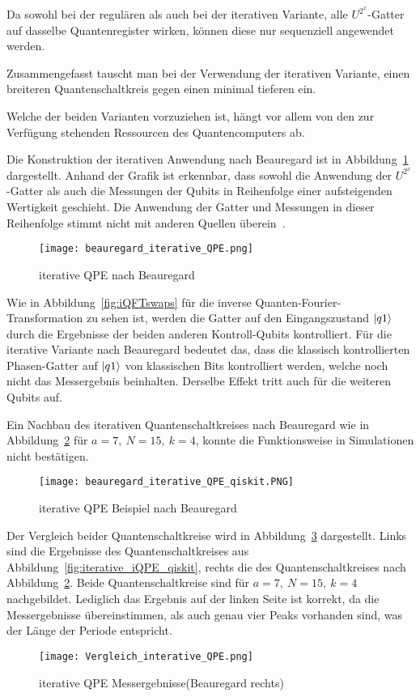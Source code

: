 Da sowohl bei der regulären als auch bei der iterativen Variante, 
alle \(U^{2^x}\)-Gatter auf dasselbe Quantenregister wirken, 
können diese nur sequenziell angewendet werden.

Zusammengefasst tauscht man bei der Verwendung der iterativen Variante, 
einen breiteren Quantenschaltkreis gegen einen minimal tieferen ein.

Welche der beiden Varianten vorzuziehen ist, 
hängt vor allem von den zur Verfügung stehenden Ressourcen des Quantencomputers ab.

\vspace{1em}

Die Konstruktion der iterativen Anwendung nach Beauregard ist in Abbildung~\ref{fig:iterative_iQPE_Beauregard} dargestellt.
Anhand der Grafik ist erkennbar, 
dass sowohl die Anwendung der \(U^{2^x}\)-Gatter als auch die Messungen der Qubits in Reihenfolge einer aufsteigenden Wertigkeit geschieht.
Die Anwendung der Gatter und Messungen in dieser Reihenfolge stimmt nicht mit anderen Quellen überein~\cite{Parker2000}.

\begin{figure}[H]
  \centering
  \texttt{[image: beauregard\_iterative\_QPE.png]}
  \caption{iterative QPE nach Beauregard~\cite{beauregard2003circuit}}
  \label{fig:iterative_iQPE_Beauregard}
\end{figure}

Wie in Abbildung~\ref{fig:iQFTswaps} für die inverse Quanten-Fourier-Transformation zu sehen ist, 
werden die Gatter auf den Eingangszustand \(\ket{q1}\) durch die Ergebnisse der beiden anderen Kontroll-Qubits kontrolliert.
Für die iterative Variante nach Beauregard bedeutet das, 
dass die klassisch kontrollierten Phasen-Gatter auf \(\ket{q1}\) von klassischen Bits kontrolliert werden, 
welche noch nicht das Messergebnis beinhalten.
Derselbe Effekt tritt auch für die weiteren Qubits auf.

Ein Nachbau des iterativen Quantenschaltkreises nach Beauregard wie in Abbildung~\ref{fig:iterative_iQPE_Beauregard_qiskit} für \(a = 7,~N=15,~k=4\), 
konnte die Funktionsweise in Simulationen nicht bestätigen.
\begin{figure}[H]
  \centering
  \texttt{[image: beauregard\_iterative\_QPE\_qiskit.PNG]}
  \caption{iterative QPE Beispiel nach Beauregard}
  \label{fig:iterative_iQPE_Beauregard_qiskit}
\end{figure}
Der Vergleich beider Quantenschaltkreise wird in Abbildung~\ref{fig:iterative_iQPE_Vergleich} dargestellt.
Links sind die Ergebnisse des Quantenschaltkreises aus Abbildung~\ref{fig:iterative_iQPE_qiskit}, 
rechts die des Quantenschaltkreises nach Abbildung~\ref{fig:iterative_iQPE_Beauregard_qiskit}.
Beide Quantenschaltkreise sind für \(a = 7,~N=15,~k=4\) nachgebildet.
Lediglich das Ergebnis auf der linken Seite ist korrekt, 
da die Messergebnisse übereinstimmen, 
als auch genau vier Peaks vorhanden sind, 
was der Länge der Periode entspricht.
\begin{figure}[H]
  \centering
  \texttt{[image: Vergleich\_interative\_QPE.png]}
  \caption{iterative QPE Messergebnisse(Beauregard rechts)}
  \label{fig:iterative_iQPE_Vergleich}
\end{figure}

